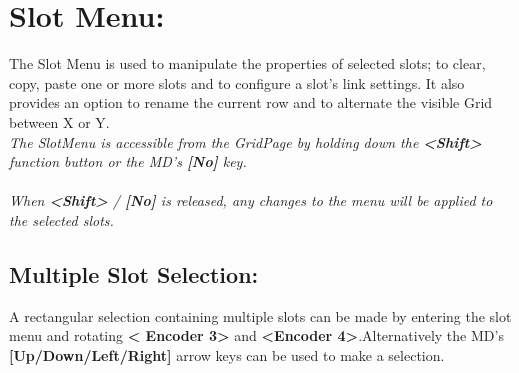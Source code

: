 \chapter{Slot Menu:}

The Slot Menu is used to manipulate the properties of selected slots; to clear, copy, paste one or more slots and to configure a slot's link settings. It also provides an option to rename the current row and to alternate the visible Grid between X or Y.
\\
\textit{The SlotMenu is accessible from the GridPage by holding down the \textbf{<Shift>} function button or the MD's \textbf{[No]} key.\\\\When \textbf{<Shift>} / \textbf{[No]} is released, any changes to the menu will be applied to the selected slots. }
\section{Multiple Slot Selection:}
A rectangular selection containing multiple slots can be made by entering the slot menu and rotating \textbf{< Encoder 3>} and \textbf{<Encoder 4>}.Alternatively the MD's \textbf{[Up/Down/Left/Right]} arrow keys can be used to make a selection.

\newpage
